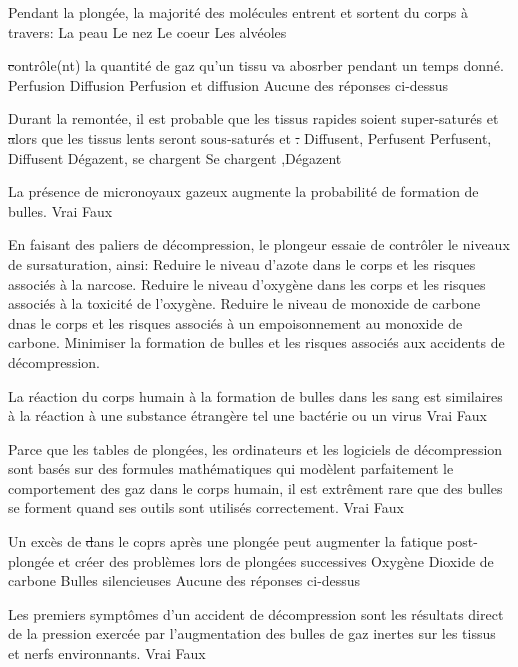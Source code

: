 \documentclass[english,10pt,a4paper,twoside]{article}
\begin{document}
	\begin{outline}
		\1  Pendant la plongée, la majorité des molécules entrent et sortent du corps à travers:
			\2 La peau
			\2 Le nez
			\2 Le coeur
			\2 Les alvéoles

		\1 \st contrôle(nt) la quantité de gaz qu'un tissu va abosrber pendant un temps donné.
			\2 Perfusion
			\2 Diffusion
			\2 Perfusion et diffusion
			\2 Aucune des réponses ci-dessus

		\1 Durant la remontée, il est probable que les tissus rapides soient super-saturés et \st alors que les tissus lents seront sous-saturés et \st.
			\2 Diffusent, Perfusent
			\2 Perfusent, Diffusent
			\2 Dégazent, se chargent
			\2 Se chargent ,Dégazent

		\1 La présence de micronoyaux gazeux augmente la probabilité de formation de bulles.
			\2 Vrai
			\2 Faux

		\1 En faisant des paliers de décompression, le plongeur essaie de contrôler le niveaux de sursaturation, ainsi:
			\2 Reduire le niveau d'azote dans le corps et les risques associés à la narcose.
			\2 Reduire le niveau d'oxygène dans les corps et les risques associés à la toxicité de l'oxygène.
			\2 Reduire le niveau de monoxide de carbone dnas le corps et les risques associés à un empoisonnement au monoxide de carbone.
			\2 Minimiser la formation de bulles et les risques associés aux accidents de décompression.

		\1 La réaction du corps humain à la formation de bulles dans les sang est similaires à la réaction à une substance étrangère tel une bactérie ou un virus
			\2 Vrai
			\2 Faux

		\1 Parce que les tables de plongées, les ordinateurs et les logiciels de décompression sont basés sur des formules mathématiques qui modèlent parfaitement le comportement des gaz dans le corps humain, il est extrêment rare que des bulles se forment quand ses outils sont utilisés correctement.
			\2 Vrai
			\2 Faux

		\1 Un excès de \st dans le coprs après une plongée peut augmenter la fatique post-plongée et créer des problèmes lors de plongées successives
			\2 Oxygène
			\2 Dioxide de carbone
			\2 Bulles silencieuses
			\2 Aucune des réponses ci-dessus

		\1 Les premiers symptômes d'un accident de décompression sont les résultats direct de la pression exercée par l'augmentation des bulles de gaz inertes sur les tissus et nerfs environnants.
			\2 Vrai
			\2 Faux
		

\end{outline}
\end{document}
